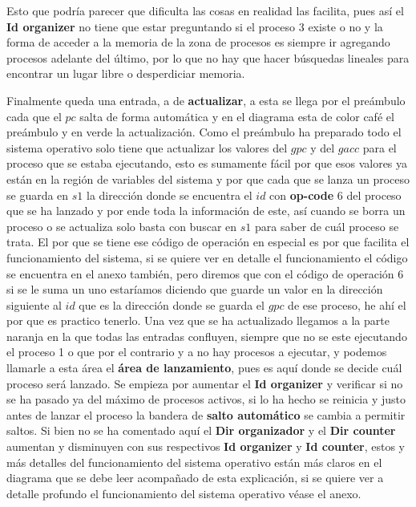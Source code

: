 \documentclass[12pt]{article}
\begin{document}
	
	Esto que podría parecer que dificulta las cosas en realidad las facilita, pues así el \textbf{Id organizer} no
	tiene que estar preguntando si el proceso 3 existe o no y la forma de acceder a la memoria de la zona de procesos
	es siempre ir agregando procesos adelante del último, por lo que no hay que hacer búsquedas lineales para encontrar
	un lugar libre o desperdiciar memoria.
	
	
	
	Finalmente queda una entrada, a de \textbf{actualizar}, a esta se llega por el preámbulo cada que el $pc$ salta
	de forma automática y en el diagrama esta de color café el preámbulo y en verde la actualización. Como
	el preámbulo ha preparado todo el sistema operativo solo tiene que actualizar los valores del $gpc$ y del
	$gacc$ para el proceso que se estaba ejecutando, esto es sumamente fácil por que esos valores ya están en la región
	de variables del sistema y por que cada que se lanza un proceso se guarda en $s1$ la dirección donde
	se encuentra el $id$ con \textbf{op-code} 6
   del proceso que se ha lanzado y por ende toda la información de este, así cuando se borra un proceso
	o se actualiza solo basta con buscar en $s1$ para saber de cuál proceso se trata. El por que se tiene ese código
	de operación en especial es por que facilita el funcionamiento del sistema, si se quiere ver en detalle el
	funcionamiento el código se encuentra en el anexo también, pero diremos que con el código de operación 6 si se
	le suma un uno estaríamos diciendo que guarde un valor en la dirección siguiente al $id$ que es la
	dirección donde se guarda el $gpc$ de ese proceso, he ahí el por que es practico tenerlo. Una vez que se ha
	actualizado llegamos a la parte naranja en la que todas las entradas confluyen, siempre que no se este ejecutando
	el proceso 1 o que por el contrario y a no hay procesos a ejecutar, y podemos llamarle a esta área el \textbf{área de lanzamiento},
	pues es aquí donde se decide cuál proceso será lanzado. Se empieza por aumentar el \textbf{Id organizer} y verificar
	si no se ha pasado ya del máximo de procesos activos, si lo ha hecho se reinicia y justo antes de
	lanzar el proceso la bandera de \textbf{salto automático} se cambia a permitir saltos. Si bien no se ha comentado aquí
	el \textbf{Dir organizador} y el \textbf{Dir counter} aumentan y disminuyen con sus respectivos \textbf{Id organizer}
	y \textbf{Id counter}, estos y más detalles del funcionamiento del sistema operativo están más claros en el diagrama que
	se debe leer acompañado de esta explicación, si se quiere ver a detalle profundo el funcionamiento
	del sistema operativo véase el anexo.
	
	
	\clearpage	
	\newpage
		
		
	
	
\end{document}
